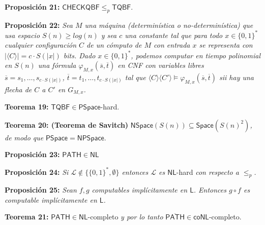 \documentclass{article}
\begin{document}
\begin{flushleft}
  \textbf{Proposición 21:}
  $\mathsf{CHECKQBF} \leq_p \mathsf{TQBF}$.
\end{flushleft}

\begin{flushleft}
  \textbf{Proposición 22:}
  \textit{Sea $M$ una máquina (determinística o no-determinística) que usa espacio $S(n) \geq log(n)$ y sea
  $c$ una constante tal que para todo $x \in \{0,1\}^*$ cualquier configuración $C$ de un cómputo de $M$ con
  entrada $x$ se representa con $|\langle C \rangle| = c \cdot S(|x|)$ bits. Dado $x \in \{0,1\}^*$, podemos
  computar en tiempo polinomial en $S(n)$ una fórmula $\varphi_{M,x}(\overline{s}, \overline{t})$ en CNF con
  variables libres $\overline{s} = s_1, \dots, s_{c \cdot S(|x|)}$, $\overline{t} = t_1, \dots, t_{c \cdot
  S(|x|)}$ tal que $\langle C \rangle \langle C' \rangle \models \varphi_{M,x}(\overline{s}, \overline{t})$
  sii hay una flecha de $C$ a $C'$ en $G_{M,x}$.}
\end{flushleft}

\begin{flushleft}
  \textbf{Teorema 19:}
  $\mathsf{TQBF} \in \mathsf{PSpace}$-hard.
\end{flushleft}

\begin{flushleft}
  \textbf{Teorema 20: \hypertarget{savitch}{\textcolor{Bittersweet}{(Teorema de Savitch)}}}
  $\mathsf{NSpace}(S(n)) \subseteq \mathsf{Space}(S(n)^2)$\textit{, de modo que} $\mathsf{PSpace} = \mathsf{
  NPSpace}$.
\end{flushleft}

\begin{flushleft}
  \textbf{Proposición 23:}
  $\mathsf{PATH} \in \mathsf{NL}$
\end{flushleft}

\begin{flushleft}
  \textbf{Proposición 24:}
  \textit{Si $\mathcal{L} \not\in \{\{0,1\}^*, \emptyset\}$ entonces $\mathcal{L}$ es $\mathsf{NL}$}-hard
  \textit{con respecto a $\leq_p$.}
\end{flushleft}

\begin{flushleft}
  \textbf{Proposición 25:}
  \textit{Sean $f,g$ computables implícitamente en $\mathsf{L}$. Entonces $g \circ f$ es computable 
  implícitamente en $\mathsf{L}$.}
\end{flushleft}

\begin{flushleft}
  \textbf{Teorema 21:}
  $\mathsf{PATH} \in \mathsf{NL}$-completo \textit{y por lo tanto} $\overline{\mathsf{PATH}} \in \mathsf{coNL}$-completo.
\end{flushleft}
\end{document}
